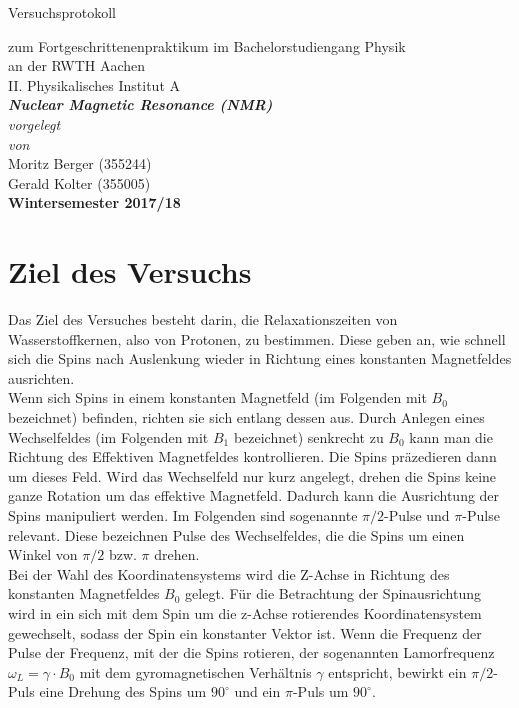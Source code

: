 \documentclass[12pt,a4paper]{article}
\author{Gerald}
\begin{document}
	\setlength{\parindent}{0pt} 
	\begin{center}
		{\LARGE Versuchsprotokoll}\\
		\begin{large}
			zum Fortgeschrittenenpraktikum im Bachelorstudiengang Physik\\[0.4cm]
			an der RWTH Aachen\\
			II. Physikalisches Institut A\\[5.5cm]
			\Large\textbf{\textsl{Nuclear Magnetic Resonance (NMR)}}\\[5.5cm]
			\normalsize\textit{vorgelegt\\von}\\[0.4cm]
			\large{Moritz Berger (355244)\\Gerald Kolter (355005)}\\[2cm]
			\large \textbf{Wintersemester 2017/18}
		\end{large}
	\end{center}
	\newpage
	
	\tableofcontents
	\newpage

\section{Ziel des Versuchs}
Das Ziel des Versuches besteht darin, die Relaxationszeiten von Wasserstoffkernen, also von Protonen, zu bestimmen. Diese geben an, wie schnell sich die Spins nach Auslenkung wieder in Richtung eines konstanten Magnetfeldes ausrichten.\\
Wenn sich Spins in einem konstanten Magnetfeld (im Folgenden mit $B_0$ bezeichnet) befinden, richten sie sich entlang dessen aus. Durch Anlegen eines Wechselfeldes (im Folgenden mit $B_1$ bezeichnet) senkrecht zu $B_0$ kann man die Richtung des Effektiven Magnetfeldes kontrollieren. Die Spins präzedieren dann um dieses Feld. Wird das Wechselfeld nur kurz angelegt, drehen die Spins keine ganze Rotation um das effektive Magnetfeld. Dadurch kann die Ausrichtung der Spins manipuliert werden. Im Folgenden sind sogenannte $\pi /2$-Pulse und $\pi$-Pulse relevant. Diese bezeichnen Pulse des Wechselfeldes, die die Spins um einen Winkel von $\pi /2$ bzw. $\pi$ drehen.\\
Bei der Wahl des Koordinatensystems wird die Z-Achse in Richtung des konstanten Magnetfeldes $B_0$ gelegt. Für die Betrachtung der Spinausrichtung wird in ein sich mit dem Spin um die z-Achse rotierendes Koordinatensystem gewechselt, sodass der Spin ein konstanter Vektor ist. Wenn die Frequenz der Pulse der Frequenz, mit der die Spins rotieren, der sogenannten Lamorfrequenz $\omega _L = \gamma \cdot B_0$ mit dem gyromagnetischen Verhältnis $\gamma$ entspricht, bewirkt ein $\pi /2$-Puls eine Drehung des Spins um $90^\circ$ und ein $\pi$-Puls um $90^\circ$.
\end{document}
